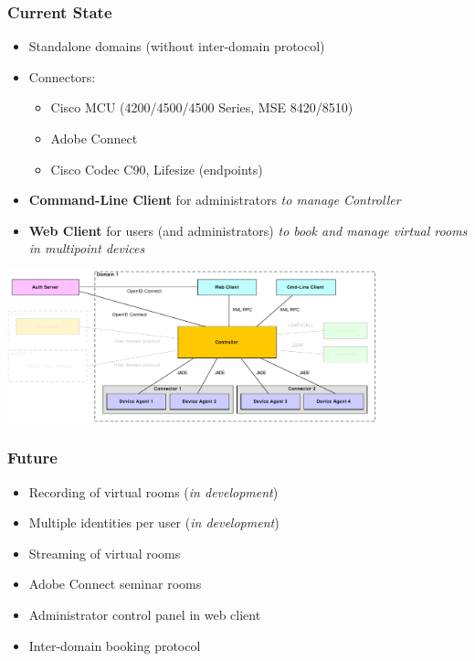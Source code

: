 \documentclass{beamer}
\begin{document}
\begin{frame}
  \frametitle{Current State}
  \begin{itemize}
    \item Standalone domains (without inter-domain protocol)
    \item Connectors:
    \begin{itemize}
      \item Cisco MCU (4200/4500/4500 Series, MSE 8420/8510)
      \item Adobe Connect
      \item Cisco Codec C90, Lifesize (endpoints)
    \end{itemize}
    \item\textbf{Command-Line Client} for administrators
    \newline\textit{to manage Controller}
    \item\textbf{Web Client} for users (and administrators)
    \newline\textit{to book and manage virtual rooms in multipoint devices}
  \end{itemize}
  \begin{center}
  \includegraphics[width=0.8\textwidth]{../architecture/diagrams/dd_architecture_implemented.pdf}
  \end{center}
\end{frame}

\begin{frame}
  \frametitle{Future}
  \begin{itemize}
    \item Recording of virtual rooms (\textit{in development})
    \item Multiple identities per user (\textit{in development})
    \item Streaming of virtual rooms
    \item Adobe Connect seminar rooms
    \item Administrator control panel in web client
    \item Inter-domain booking protocol
  \end{itemize}
\end{frame}
\end{document}
